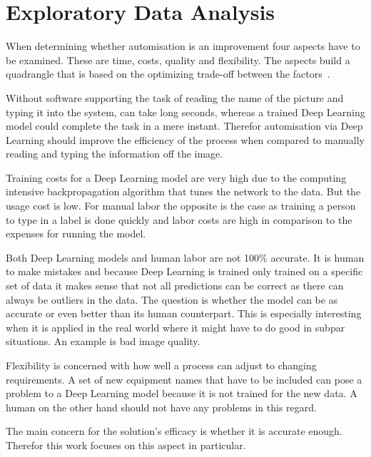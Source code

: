 \chapter{Exploratory Data Analysis}

When determining whether automisation is an improvement four aspects have to be examined.
These are time, costs, quality and flexibility.
The aspects build a quadrangle that is based on the optimizing trade-off between the
factors~\cite{dumas_fundamentals_2013}.

Without software supporting the task of reading the name of the picture  and typing it into
the system, can take long seconds, whereas a trained Deep Learning model could complete the task
in a mere instant.
Therefor automisation via Deep Learning should improve the efficiency of the process when compared to
manually reading and typing the information off the image.

Training costs for a Deep Learning model are very high due to the computing intensive
backpropagation algorithm that tunes the network to the data.
But the usage cost is low.
For manual labor the opposite is the case as training a person to type in a label is done quickly
and labor costs are high in comparison to the expenses for running the model.

Both Deep Learning models and human labor are not 100\% accurate.
It is human to make mistakes and because Deep Learning is trained only trained on a specific set
of data it makes sense that not all predictions can be correct as there can always be outliers in
the data. %
The question is whether the model can be as accurate or even better than its human counterpart.
This is especially interesting when it is applied in the real world where it might have to do good
in subpar situations.
An example is bad image quality.

Flexibility is concerned with how well a process can adjust to changing requirements.
A set of new equipment names that have to be included can pose a problem to a Deep Learning model
because it is not trained for the new data.
A human on the other hand should not have any problems in this regard.

The main concern for the solution's efficacy is whether it is accurate enough.
Therefor this work focuses on this aspect in particular.
